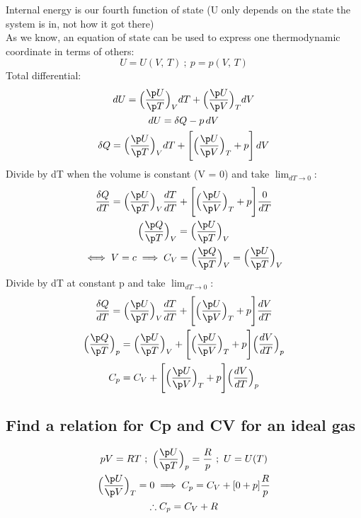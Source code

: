 \documentclass[a4paper, 11pt, normalem]{report}
\begin{document}
Internal energy is our fourth function of state (U only depends on the state the system is in, not how it got there) \\
As we know, an equation of state can be used to express one thermodynamic coordinate in terms of others:
\begin{equation*}
    U = U(V,\,T) ~;~ p = p(V,\,T)
\end{equation*}
Total differential:
\begin{gather*}
    dU = \Big(\frac{\p U}{\p T} \Big)_V dT + \Big(\frac{\p U}{\p V} \Big)_T dV \\
    dU = \delta Q - p\,dV \\
    \delta Q = \Big(\frac{\p U}{\p T} \Big)_V dT + \Bigg[\Big(\frac{\p U}{\p V} \Big)_T + p \Bigg]\,dV
\end{gather*}
Divide by dT when the volume is constant (V = 0) and take $\lim_{dT \to 0}$:
\begin{gather*}
    \frac{\delta Q}{dT} = \Big(\frac{\p U}{\p T} \Big)_{V} \frac{dT}{dT} + \Bigg[\Big(\frac{\p U}{\p V} \Big)_T + p \Bigg]\frac{0}{dT} \\
    \Big(\frac{\p Q}{\p T} \Big)_V = \Big(\frac{\p U}{\p T} \Big)_{V} \\
    \iff V = c \implies C_{V} = \Big(\frac{\p Q}{\p T} \Big)_{V} = \Big(\frac{\p U}{\p T} \Big)_{V}
\end{gather*}
Divide by dT at constant p and take $\lim_{dT \to 0}$:
\begin{gather*}
    \frac{\delta Q}{dT} = \Big(\frac{\p U}{\p T} \Big)_{V} \frac{dT}{dT} + \Bigg[\Big(\frac{\p U}{\p V} \Big)_T + p \Bigg]\frac{dV}{dT} \\
    \Big(\frac{\p Q}{\p T} \Big)_{p} = \Big(\frac{\p U}{\p T} \Big)_{V} + \Bigg[\Big(\frac{\p U}{\p V} \Big)_T + p \Bigg] \Big(\frac{dV}{dT} \Big)_{p} \\
    C_p = C_V + \Bigg[\Big(\frac{\p U}{\p V} \Big)_T + p \Bigg] \Big(\frac{dV}{dT} \Big)_{p}
\end{gather*}

\subsection{Find a relation for Cp and CV for an ideal gas}
\begin{gather*}
    pV = RT ~;~ \Big(\frac{\p U}{\p T} \Big)_{p} = \frac{R}{p} ~;~ U = U(T) \\
    \Big(\frac{\p U}{\p V} \Big)_{T} = 0 \implies C_p = C_V + [0 + p]\frac{R}{p} \\
    \therefore C_p = C_V + R
\end{gather*}
\end{document}
